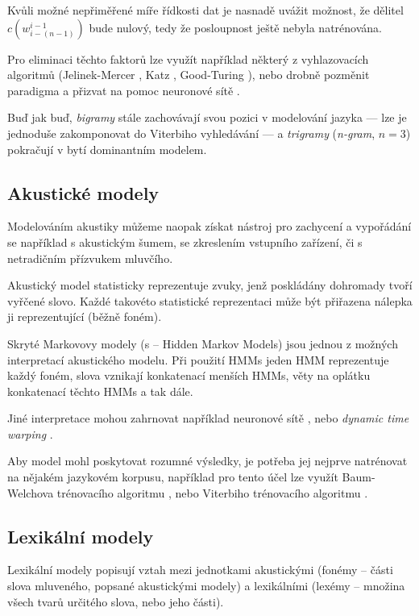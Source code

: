 Kvůli možné nepřiměřené míře řídkosti dat je nasnadě uvážit možnost, že dělitel $c(w_{i-(n-1)}^{i-1})$ bude nulový, tedy že posloupnost ještě nebyla natrénována. 

Pro eliminaci těchto faktorů lze využít například některý z vyhlazovacích algoritmů (Jelinek-Mercer \cite{jelinek_1980}, Katz \cite{katz_1987}, Good-Turing \cite{church_1991}), nebo drobně pozměnit paradigma a přizvat na pomoc neuronové sítě \cite{chienli_2013}.

Buď jak buď, {\sl bigramy} stále zachovávají svou pozici v modelování jazyka --- lze je jednoduše zakomponovat do Viterbiho vyhledávání \cite{goblirsch_1996} --- a {\sl trigramy} ({\sl n-gram}, $n=3$) pokračují v bytí dominantním modelem.

\subsection{Akustické modely}

Modelováním akustiky můžeme naopak získat nástroj pro zachycení a vypořádání se například s akustickým šumem, se zkreslením vstupního zařízení, či s netradičním přízvukem mluvčího.

Akustický model statisticky reprezentuje zvuky, jenž poskládány dohromady tvoří vyřčené slovo. Každé takovéto statistické reprezentaci může být přiřazena nálepka ji reprezentující (běžně foném).

Skryté Markovovy modely (s -- Hidden Markov Models) \cite{poritz_1988} jsou jednou z možných interpretací akustického modelu. Při použití HMMs jeden HMM reprezentuje každý foném, slova vznikají konkatenací menších HMMs, věty na oplátku konkatenací těchto HMMs a tak dále.

Jiné interpretace mohou zahrnovat například neuronové sítě \cite{kingsbury_2009}, nebo {\sl dynamic time warping} \cite{tarar_2010}.

Aby model mohl poskytovat rozumné výsledky, je potřeba jej nejprve natrénovat na nějakém jazykovém korpusu, například pro tento účel lze využít Baum-Welchova trénovacího algoritmu \cite{han_2003}, nebo Viterbiho trénovacího algoritmu \cite{franzini_1990}.

\subsection{Lexikální modely}

Lexikální modely popisují vztah mezi jednotkami akustickými (fonémy -- části slova mluveného, popsané akustickými modely) a lexikálními (lexémy -- množina všech tvarů určitého slova, nebo jeho části). 

